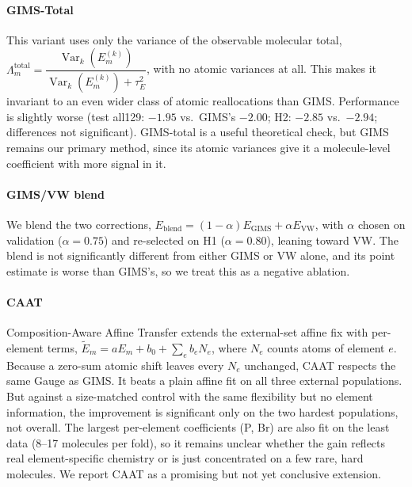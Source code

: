 \documentclass{article}
\begin{document}
\paragraph{GIMS-Total} This variant uses only the variance of the observable
molecular total, $\Lambda_m^{\mathrm{total}} = \dfrac{\operatorname{Var}_k(E_m^{(k)})}
{\operatorname{Var}_k(E_m^{(k)})+\tau_E^2}$, with no atomic variances at
all. This makes it invariant to an even wider class of atomic reallocations
than GIMS. Performance is slightly worse (test all129: $-1.95$ vs.\ GIMS's
$-2.00$; H2: $-2.85$ vs.\ $-2.94$; differences not significant). GIMS-total
is a useful theoretical check, but GIMS remains our primary method, since
its atomic variances give it a molecule-level coefficient with more signal
in it.

\paragraph{GIMS/VW blend} We blend the two corrections,
$E_{\mathrm{blend}}=(1-\alpha)E_{\mathrm{GIMS}}+\alpha E_{\mathrm{VW}}$, with
$\alpha$ chosen on validation ($\alpha=0.75$) and re-selected on H1
($\alpha=0.80$), leaning toward VW. The blend is not significantly
different from either GIMS or VW alone, and its point estimate is worse
than GIMS's, so we treat this as a negative ablation.

\paragraph{CAAT} Composition-Aware Affine Transfer extends the external-set
affine fix with per-element terms, $\tilde E_m = aE_m + b_0 + \sum_e b_e
N_e$, where $N_e$ counts atoms of element $e$. Because a zero-sum atomic
shift leaves every $N_e$ unchanged, CAAT respects the same Gauge as GIMS.
It beats a plain affine fit on all three external populations. But against
a size-matched control with the same flexibility but no element
information, the improvement is significant only on the two hardest
populations, not overall. The largest per-element coefficients (P, Br) are
also fit on the least data (8--17 molecules per fold), so it remains
unclear whether the gain reflects real element-specific chemistry or is
just concentrated on a few rare, hard molecules. We report CAAT as a
promising but not yet conclusive extension.
\end{document}
